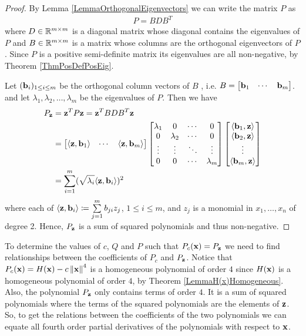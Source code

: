 \documentclass[a4paper,12pt,twoside,BCOR=10mm]{scrbook}
\begin{document}
\begin{proof}
By Lemma \ref{LemmaOrthogonalEigenvectors} we can write the matrix $P$ as
\begin{align}
    P = BDB^T
\end{align}
where $D \in \mathbb{R}^{m \times m}$ is a diagonal matrix whose diagonal contains the eigenvalues of $P$ and $B \in \mathbb{R}^{m \times m}$ is a matrix whose columns are the orthogonal eigenvectors of $P$. Since $P$ is a positive semi-definite matrix its eigenvalues are all non-negative, by Theorem \ref{ThmPosDefPosEig}.

Let $(\mathbf{b}_i)_{1\leq i \leq m}$ be the orthogonal column vectors of $B$
\if, i.e. $B = \begin{bmatrix}
\mathbf{b}_1 & \cdots & \mathbf{b}_m
\end{bmatrix}$.
\fi
and let $\lambda_1, \lambda_2, \ldots, \lambda_m$ be the eigenvalues of $P$. Then we have
\begin{align*}
    P_{\mathbf{z}} &= \mathbf{z}^T P \mathbf{z} = \mathbf{z}^T B D B^T \mathbf{z}\\
    &= \begin{bmatrix}
    \langle \mathbf{z}, \mathbf{b}_1 \rangle & \cdots & \langle \mathbf{z}, \mathbf{b}_m \rangle
    \end{bmatrix}
    \begin{bmatrix}
    \lambda_1 & 0 & \cdots & 0\\
    0 & \lambda_2 & \cdots & 0\\
    \vdots & \vdots & \ddots & \vdots\\
    0 & 0 & \cdots & \lambda_m
    \end{bmatrix}
    \begin{bmatrix}
    \langle \mathbf{b}_1, \mathbf{z} \rangle\\
    \langle \mathbf{b}_2, \mathbf{z} \rangle\\
    \vdots\\
    \langle \mathbf{b}_m, \mathbf{z} \rangle
    \end{bmatrix}\\
    &= \sum_{i = 1}^m (\sqrt{\lambda_i}\langle \mathbf{z}, \mathbf{b}_i \rangle)^2
\end{align*}
where each of $\langle \mathbf{z}, \mathbf{b}_i \rangle \coloneqq \sum\limits_{j = 1}^m b_{ji}z_j$, $1 \leq i \leq m$, and $z_j$ is a monomial in $x_1, \ldots, x_n$ of degree 2. Hence, $P_{\mathbf{z}}$ is a sum of squared polynomials and thus non-negative.
\end{proof}

To determine the values of $c$, $Q$ and $P$ such that $P_c(\mathbf{x}) = P_{\mathbf{z}}$ we need to find relationships between the coefficients of $P_c$ and $P_{\mathbf{z}}$. Notice that $P_c(\mathbf{x}) = H(\mathbf{x}) - c\left\lVert\mathbf{x}\right\rVert^4$ is a homogeneous polynomial of order $4$ since $H(\mathbf{x})$ is a homogeneous polynomial of order $4$, by Theorem \ref{LemmaH(x)Homogeneous}. Also, the polynomial $P_{\mathbf{z}}$ only contains terms of order $4$. It is a sum of squared polynomials where the terms of the squared polynomials are the elements of $\mathbf{z}$. So, to get the relations between the coefficients of the two polynomials we can equate all fourth order partial derivatives of the polynomials with respect to $\mathbf{x}$.
\end{document}

